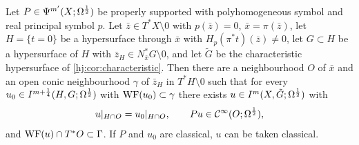 \begin{theorem}\label{hj:thm:travelling}
  Let $P\in\Psi^{m'}(X;\Omega^{\frac12})$ be properly supported with polyhomogeneous
  symbol and real principal symbol $p$.  Let $\bar z\in T^*X\setminus0$ with
  $p(\bar z)=0$, $\bar x=\pi(\bar z)$, let $H=\{t=0\}$ be a hypersurface through
  $\bar x$ with $H_p(\pi^*t)(\bar z)\neq0$, let $G\subset H$ be a hypersurface of
  $H$ with $\bar z_H\in N^*_{\bar x}G\setminus0$, and let $\tilde G$ be the
  characteristic hypersurface of \cref{hj:cor:characteristic}.  Then there are a
  neighbourhood $O$ of $\bar x$ and an open conic neighbourhood $\gamma$ of
  $\bar z_H$ in $T^*H\setminus0$ such that for every
  $u_0\in I^{m+\frac14}(H,G;\Omega^{\frac12})$ with $\operatorname{WF}(u_0)\subset\gamma$ there exists
  $u\in I^{m}(X,\tilde G;\Omega^{\frac12})$ with
  \begin{equation*}
    u|_{H\cap O}=u_0|_{H\cap O},\qquad Pu\in\mathcal{C}^\infty(O;\Omega^{\frac12}),
  \end{equation*}
  and $\operatorname{WF}(u)\cap T^*O\subset\Gamma$.  If $P$ and $u_0$ are classical, $u$ can be
  taken classical.
\end{theorem}
